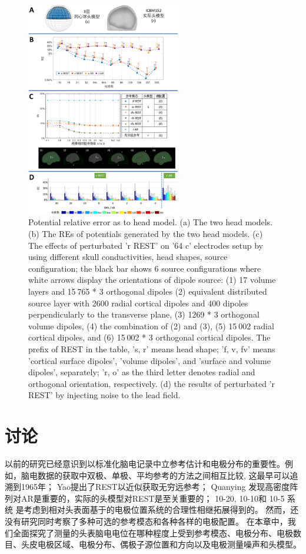 \begin{figure}[h!]
	\centering
	\includegraphics[width=0.6\textwidth,natwidth=610,natheight=642]{pic/JNE/figure9.png}
	\caption{Potential relative error as to head model. (a) The two head models. (b) The REs of potentials generated by the two head models. (c) The effects of perturbated 'r REST' on '64 c' electrodes setup by using different skull conductivities, head shapes, source configuration; the black bar shows 6 source configurations where white arrows display the orientations of dipole source: (1) 17 volume layers and 15 765 * 3 orthogonal dipoles (2) equivalent distributed source layer with 2600 radial cortical dipoles and 400 dipoles perpendicularly to the transverse plane, (3) 1269 * 3 orthogonal volume dipoles, (4) the combination of (2) and (3), (5) 15 002 radial cortical dipoles, and (6) 15 002 * 3 orthogonal cortical dipoles. The prefix of REST in the table, 's, r' means head shape; 'f, v, fv' means 'cortical surface dipoles', 'volume dipoles', and 'surface and volume dipoles', separately; 'r, o' as the third letter denotes radial and orthogonal orientation, respectively. (d) the results of perturbated 'r REST' by injecting noise to the lead field.}
	\label{2.9}
\end{figure}

\section{讨论}
以前的研究已经意识到以标准化脑电记录中立参考估计和电极分布的重要性。例如，脑电数据的获取中双极、单极、平均参考的方法之间相互比较, 这最早可以追溯到1965年； Yao提出了REST以近似获取无穷远参考； Quanying
发现高密度阵列对AR是重要的，实际的头模型对REST是至关重要的； 10-20, 10-10和 10-5 系统 是考虑到相对头表面基于的电极位置系统的合理性相继拓展得到的。 然而，还没有研究同时考察了多种可选的参考模态和各种各样的电极配置。 在本章中，我们全面探究了测量的头表脑电电位在哪种程度上受到参考模态、电极分布、电极数目、头皮电极区域、电极分布、偶极子源位置和方向以及电极测量噪声和头模型。

